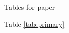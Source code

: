 \documentclass{article}\usepackage[]{graphicx}\usepackage[]{color}
\begin{document}





Tables for paper












Table \ref{tab:primary}
\end{document}
